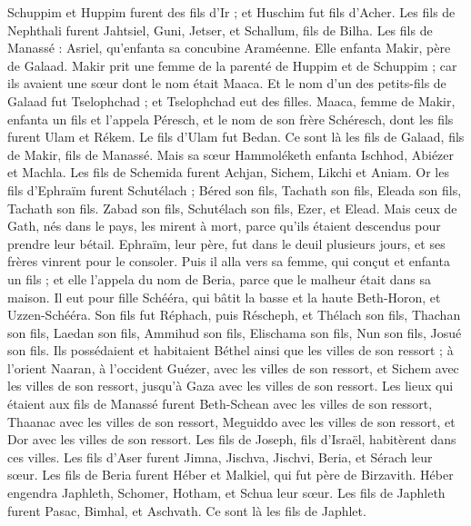 \begin{multicols}{2}
Schuppim et Huppim furent des fils d'Ir ; et Huschim fut fils d'Acher.
Les fils de Nephthali furent Jahtsiel, Guni, Jetser, et Schallum, fils de Bilha.
Les fils de Manassé : Asriel, qu'enfanta sa concubine Araméenne. Elle enfanta Makir, père de Galaad.
Makir prit une femme de la parenté de Huppim et de Schuppim ; car ils avaient une sœur dont le nom était Maaca. Et le nom d'un des petits-fils de Galaad fut Tselophchad ; et Tselophchad eut des filles.
Maaca, femme de Makir, enfanta un fils et l'appela Péresch, et le nom de son frère Schéresch, dont les fils furent Ulam et Rékem.
Le fils d'Ulam fut Bedan. Ce sont là les fils de Galaad, fils de Makir, fils de Manassé.
Mais sa sœur Hammoléketh enfanta Ischhod, Abiézer et Machla.
Les fils de Schemida furent Achjan, Sichem, Likchi et Aniam.
Or les fils d'Ephraïm furent Schutélach ; Béred son fils, Tachath son fils, Eleada son fils, Tachath son fils.
Zabad son fils, Schutélach son fils, Ezer, et Elead. Mais ceux de Gath, nés dans le pays, les mirent à mort, parce qu'ils étaient descendus pour prendre leur bétail.
Ephraïm, leur père, fut dans le deuil plusieurs jours, et ses frères vinrent pour le consoler.
Puis il alla vers sa femme, qui conçut et enfanta un fils ; et elle l'appela du nom de Beria, parce que le malheur était dans sa maison.
Il eut pour fille Schééra, qui bâtit la basse et la haute Beth-Horon, et Uzzen-Schééra.
Son fils fut Réphach, puis Réscheph, et Thélach son fils, Thachan son fils,
Laedan son fils, Ammihud son fils, Elischama son fils,
Nun son fils, Josué son fils.
Ils possédaient et habitaient Béthel ainsi que les villes de son ressort ; à l'orient Naaran, à l'occident Guézer, avec les villes de son ressort, et Sichem avec les villes de son ressort, jusqu'à Gaza avec les villes de son ressort.
Les lieux qui étaient aux fils de Manassé furent Beth-Schean avec les villes de son ressort, Thaanac avec les villes de son ressort, Meguiddo avec les villes de son ressort, et Dor avec les villes de son ressort. Les fils de Joseph, fils d'Israël, habitèrent dans ces villes.
Les fils d'Aser furent Jimna, Jischva, Jischvi, Beria, et Sérach leur sœur.
Les fils de Beria furent Héber et Malkiel, qui fut père de Birzavith.
Héber engendra Japhleth, Schomer, Hotham, et Schua leur sœur.
Les fils de Japhleth furent Pasac, Bimhal, et Aschvath. Ce sont là les fils de Japhlet.

\end{multicols}
